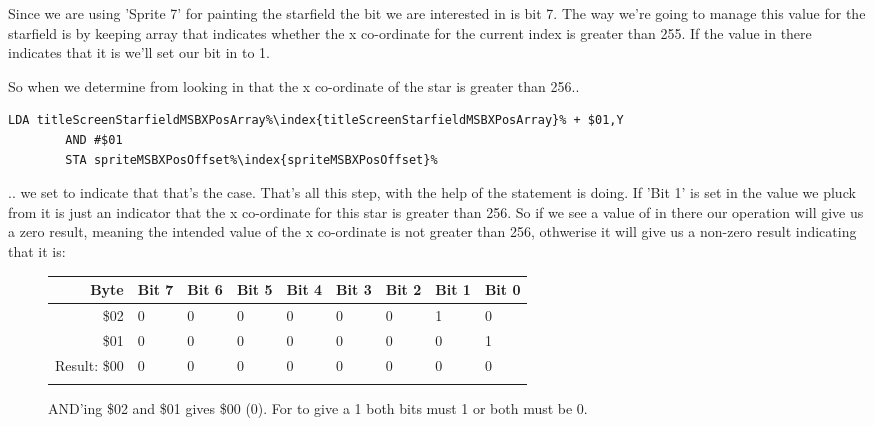 Since we are using 'Sprite 7' for painting the starfield the bit we are interested in is bit 7. The way
we're going to manage this value for the starfield is by keeping array 
that indicates whether the x co-ordinate for the current index is greater than 255. If the value in there
indicates that it is we'll set our bit in  to 1.

So when
we determine from looking in  that the x co-ordinate of the star is greater
than 256..

\begin{lstlisting}[basicstyle=\tiny,escapechar=\%]
        LDA titleScreenStarfieldMSBXPosArray%\index{titleScreenStarfieldMSBXPosArray}% + $01,Y
        AND #$01
        STA spriteMSBXPosOffset%\index{spriteMSBXPosOffset}%
\end{lstlisting}

.. we set  to indicate that that's the case. That's all this step, with the help
of the  statement is doing. If 'Bit 1' is
set in the value we pluck from  it is just an indicator that the x co-ordinate
for this star is greater than 256. So if we see a value of  in there our operation  will
give us a zero result, meaning the intended value of the x co-ordinate is not greater than 256, othwerise it will give
us a non-zero result indicating that it is:

\begin{figure}[H]
  {
    \setlength{\tabcolsep}{3.0pt}
    \setlength\cmidrulewidth{\heavyrulewidth} %
    \begin{adjustbox}{width=10cm,center}

      \begin{tabular}{rllllllll}
        \toprule
        Byte & Bit 7 & Bit 6 & Bit 5 & Bit 4 & Bit 3 & Bit 2 & Bit 1 & Bit 0        \\
        \midrule
        \$02 & 0 & 0 & 0 & 0 & 0 & 0 & 1 & 0 \\
        \$01 & 0 & 0 & 0 & 0 & 0 & 0 & 0 & 1 \\
        \midrule
        Result: \$00 & 0 & 0 & 0 & 0 & 0 & 0 & 0 & 0 \\
        \addlinespace
        \bottomrule
      \end{tabular}
    \end{adjustbox}
  }\caption*{AND'ing \$02 and \$01 gives \$00 (0). For  to give a 1 both bits must 1 or both must be 0.}
\end{figure}

